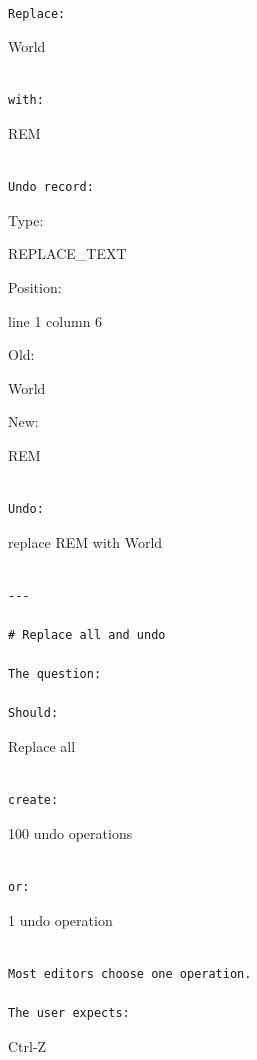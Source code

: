 \documentclass[
  oneside,
  openany]{book}
\begin{document}
\begin{verbatim}

Replace:
\end{verbatim}

World

\begin{verbatim}

with:
\end{verbatim}

REM

\begin{verbatim}

Undo record:
\end{verbatim}

Type:

REPLACE\_TEXT

Position:

line 1 column 6

Old:

World

New:

REM

\begin{verbatim}

Undo:
\end{verbatim}

replace REM with World

\begin{verbatim}

---

# Replace all and undo

The question:

Should:
\end{verbatim}

Replace all

\begin{verbatim}

create:
\end{verbatim}

100 undo operations

\begin{verbatim}

or:
\end{verbatim}

1 undo operation

\begin{verbatim}

Most editors choose one operation.

The user expects:
\end{verbatim}

Ctrl-Z
\end{document}
